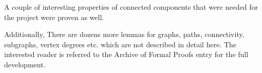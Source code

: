 A couple of interesting properties of connected components that were needed for the project were proven as well.

Additionally, There are dozens more lemmas for graphs, paths, connectivity, subgraphs, vertex degrees etc. which are not described in detail here.
The interested reader is referred to the Archive of Formal Proofs entry for the full development.
